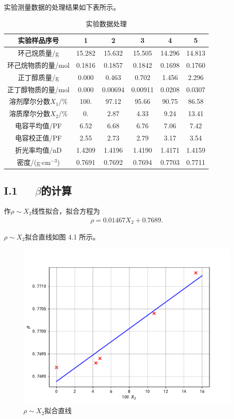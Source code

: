 \documentclass[12pt]{ctexart}
\numberwithin{equation}{section}
\begin{document}
实验测量数据的处理结果如下表所示。
\begin{longtable}{c|ccccc}
    \caption{实验数据处理} \\
    \hline
    实验样品序号 & 1 & 2 & 3 & 4 & 5 \\
    \hline
    环己烷质量/g & 15.282 &  15.632 &  15.505 &  14.296 &  14.813  \\
    \hline
    环己烷物质的量/mol & 0.1816 & 0.1857 & 0.1842 & 0.1698 & 0.1760 \\
    \hline
    正丁醇质量/g & 0.000 &  0.463 &  0.702 &  1.456 &  2.296  \\
    \hline
    正丁醇物质的量/mol & 0.000 & 0.00694 & 0.00911 & 0.0208 & 0.0307 \\
    \hline
    溶剂摩尔分数$X_1$/\% & 100. &  97.12 &  95.66 &  90.75 &  86.58  \\
    \hline
    溶质摩尔分数$X_2$/\% & 0. &  2.87 &  4.33 &  9.24 &  13.41  \\
    \hline
    电容平均值/PF & 6.52 & 6.68 & 6.76 & 7.06 & 7.42 \\
    \hline
    电容校正值/PF & 2.55 & 2.73 & 2.79 & 3.17 & 3.54 \\
    \hline
    折光率均值/nD & 1.4209 & 1.4196 & 1.4190 & 1.4171 & 1.4159 \\
    \hline
    密度/(g$\cdot$cm$^{-3}$) & 0.7691 & 0.7692 & 0.7694 & 0.7703 & 0.7711 \\
    \hline
\end{longtable}

\subsection*{I.1~~~$\beta$的计算}

作$\rho\sim X_2$线性拟合，拟合方程为
\begin{align}
    \rho = 0.01467 X_2 + 0.7689.
    \tag{I.1}
\end{align}

$\rho\sim X_2$拟合直线如图 4.1 所示。
\begin{figure}[!h]
    \centering
    \includegraphics[scale=0.7]{fitting_beta.pdf}
    \caption{$\rho\sim X_2$拟合直线}
\end{figure}
\end{document}
